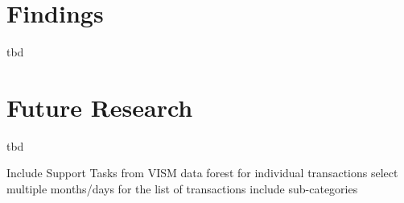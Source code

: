 \section{Findings}

tbd




\section{Future Research}

tbd


Include Support Tasks from VISM
data forest for individual transactions
select multiple months/days for the list of transactions
include sub-categories